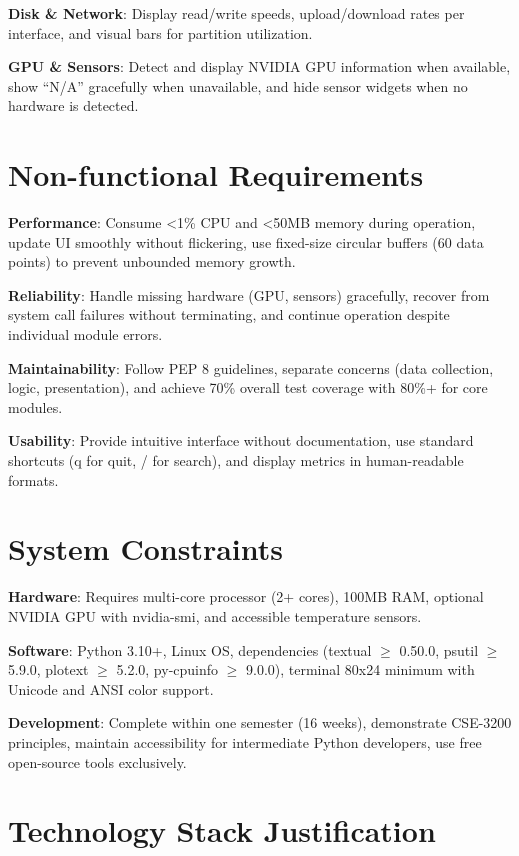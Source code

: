 \documentclass[12pt,a4paper,oneside]{report}
\begin{document}
\textbf{Disk \& Network}: Display read/write speeds, upload/download rates per interface, and visual bars for partition utilization.

\textbf{GPU \& Sensors}: Detect and display NVIDIA GPU information when available, show ``N/A'' gracefully when unavailable, and hide sensor widgets when no hardware is detected.

\section{Non-functional Requirements}
\label{sec:non-functional-requirements}

\textbf{Performance}: Consume <1\% CPU and <50MB memory during operation, update UI smoothly without flickering, use fixed-size circular buffers (60 data points) to prevent unbounded memory growth.

\textbf{Reliability}: Handle missing hardware (GPU, sensors) gracefully, recover from system call failures without terminating, and continue operation despite individual module errors.

\textbf{Maintainability}: Follow PEP 8 guidelines, separate concerns (data collection, logic, presentation), and achieve 70\% overall test coverage with 80\%+ for core modules.

\textbf{Usability}: Provide intuitive interface without documentation, use standard shortcuts (q for quit, / for search), and display metrics in human-readable formats.

\section{System Constraints}
\label{sec:system-constraints}

\textbf{Hardware}: Requires multi-core processor (2+ cores), 100MB RAM, optional NVIDIA GPU with nvidia-smi, and accessible temperature sensors.

\textbf{Software}: Python 3.10+, Linux OS, dependencies (textual $\geq$ 0.50.0, psutil $\geq$ 5.9.0, plotext $\geq$ 5.2.0, py-cpuinfo $\geq$ 9.0.0), terminal 80x24 minimum with Unicode and ANSI color support.

\textbf{Development}: Complete within one semester (16 weeks), demonstrate CSE-3200 principles, maintain accessibility for intermediate Python developers, use free open-source tools exclusively.

\section{Technology Stack Justification}
\label{sec:technology-stack}
\end{document}
